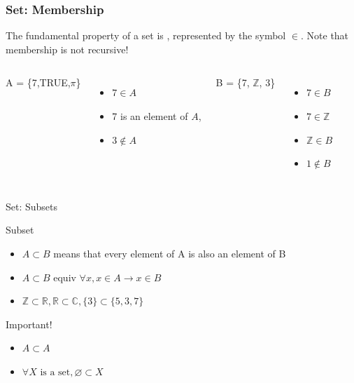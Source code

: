 \begin{frame}
  \frametitle{Set: Membership}

  The fundamental property of a set is , represented by the symbol $\in$. Note that membership is \alert{not} recursive!\vfill

  \begin{columns}
  A = \{7,TRUE,$\pi$\}
  \begin{itemize}
  \item $7 \in A$
  \item 7 is an element of $A$,
  \item $3 \notin A$
  \end{itemize}\bigskip

  B = \{7, $\mathbb{Z}$, 3\}
  \begin{itemize}
    \item $7 \in B$
    \item $7 \in \mathbb{Z}$
    \item $\mathbb{Z} \in B$
    \item \alert{$1 \notin B$}
  \end{itemize}
\end{columns}
\end{frame}

\begin{frame}{Set: Subsets}

  {\larger
  \begin{block}{Subset}
    \begin{itemize}
    \item $A \subset B$ means that every element of A is also an element of B
    \item $A\subset B \text{ equiv }\forall x, x\in A \rightarrow x\in B$
    \item $\mathbb{Z} \subset \mathbb{R}, \mathbb{R} \subset \mathbb{C}, \{3\} \subset \{5,3,7\}$
    \end{itemize}
  \end{block}

  \begin{block}{Important!}
    \begin{itemize}
    \item $A \subset A$
    \item $\forall X\text{ is a set}, \varnothing \subset X$
    \end{itemize}
  \end{block}
  }
\end{frame}

